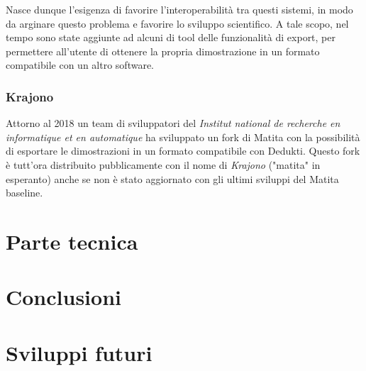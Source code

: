 \documentclass[12pt,a4paper]{report}
\begin{document}
Nasce dunque l'esigenza di favorire l'interoperabilità tra questi sistemi, in
modo da arginare questo problema e favorire lo sviluppo scientifico. 
A tale scopo, nel tempo sono state aggiunte ad alcuni di tool delle funzionalità
di export, per permettere all'utente di ottenere la propria dimostrazione in un
formato compatibile con un altro software.

\subsection{Krajono}
Attorno al 2018 un team di sviluppatori del \textit{Institut national de recherche
en informatique et en automatique} %
ha sviluppato un fork di Matita con la possibilità di esportare le dimostrazioni
in un formato compatibile con Dedukti. Questo fork è tutt'ora distribuito 
pubblicamente con il nome di \textit{Krajono} ("matita" in esperanto) anche se 
non è stato aggiornato con gli ultimi sviluppi del Matita baseline.




\chapter{Parte tecnica} %

\chapter{Conclusioni}

\chapter{Sviluppi futuri}
\end{document}
